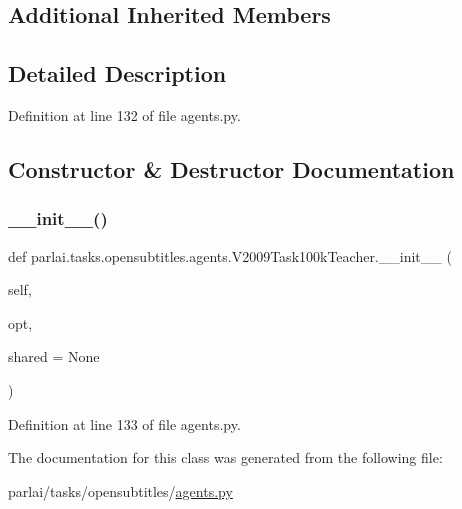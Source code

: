 \subsection*{Additional Inherited Members}


\subsection{Detailed Description}


Definition at line 132 of file agents.\+py.



\subsection{Constructor \& Destructor Documentation}
\mbox{\label{classparlai_1_1tasks_1_1opensubtitles_1_1agents_1_1V2009Task100kTeacher_a99fe8e12c849b677378eb7ed8c18f344}} 
\subsubsection{\texorpdfstring{\+\_\+\+\_\+init\+\_\+\+\_\+()}{\_\_init\_\_()}}
{\footnotesize\ttfamily def parlai.\+tasks.\+opensubtitles.\+agents.\+V2009\+Task100k\+Teacher.\+\_\+\+\_\+init\+\_\+\+\_\+ (\begin{DoxyParamCaption}\item[{}]{self,  }\item[{}]{opt,  }\item[{}]{shared = {\ttfamily None} }\end{DoxyParamCaption})}



Definition at line 133 of file agents.\+py.



The documentation for this class was generated from the following file\+:\begin{DoxyCompactItemize}
\item 
parlai/tasks/opensubtitles/\hyperlink{parlai_2tasks_2opensubtitles_2agents_8py}{agents.\+py}\end{DoxyCompactItemize}
